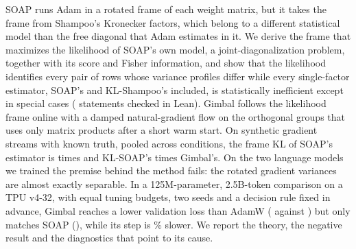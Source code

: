 SOAP runs Adam in a rotated frame of each weight matrix, but it takes the frame from Shampoo's
Kronecker factors, which belong to a different statistical model than the free diagonal that Adam
estimates in it. We derive the frame that maximizes the likelihood of SOAP's own model, a
joint-diagonalization problem, together with its score and Fisher information, and show that the
likelihood identifies every pair of rows whose variance profiles differ while every
single-factor estimator, SOAP's and KL-Shampoo's included, is statistically inefficient except in
special cases (\LeanCount{} statements checked in Lean). Gimbal follows the likelihood frame online
with a damped natural-gradient flow on the orthogonal groups that uses only matrix products after a
short warm start. On synthetic gradient streams with known truth, pooled across conditions, the
frame KL of SOAP's estimator is \FactorSoap{} times and KL-SOAP's \FactorKlsoap{} times Gimbal's. On
the two language models we trained the premise behind the method fails: the rotated gradient
variances are almost exactly separable. In a 125M-parameter, 2.5B-token comparison on a
TPU v4-32, with equal tuning budgets, two seeds and a decision rule fixed in advance, Gimbal reaches
a lower validation loss than AdamW (\ValGimbal{} against \ValAdamw{}) but only matches SOAP
(\ValSoap{}), while its step is \MainStepGimbalOverSoap\% slower. We report the theory, the
negative result and the diagnostics that point to its cause.
